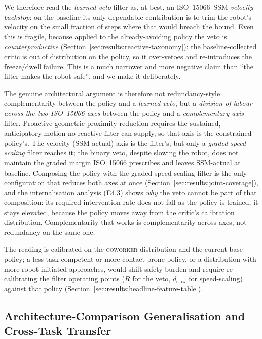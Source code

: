 \documentclass[11pt,a4paper]{report}
\newcommand{\ssm}{SSM}
\newcommand{\iso}{ISO~15066}
\newcommand{\coworker}{\textsc{coworker}}
\begin{document}
We therefore read the \emph{learned veto} filter as, at best, an
\iso{}~\ssm{} \emph{velocity backstop}: on the baseline its only
dependable contribution is to trim the robot's velocity on the small
fraction of steps where that would breach the bound. Even this is
fragile, because applied to the already-avoiding policy the veto is
\emph{counterproductive} (Section~\ref{sec:results:reactive-taxonomy}):
the baseline-collected critic is out of distribution on the policy, so
it over-vetoes and re-introduces the freeze/dwell failure. This is a
much narrower and more negative claim than ``the filter makes the
robot safe'', and we make it deliberately.

The genuine architectural argument is therefore not redundancy-style
complementarity between the policy and a \emph{learned veto}, but a
\emph{division of labour across the two \iso{} axes} between the policy
and a \emph{complementary-axis} filter. Proactive geometric-proximity
reduction requires the sustained, anticipatory motion no reactive
filter can supply, so that axis is the constrained policy's. The
velocity (\ssm{}-actual) axis is the filter's, but only a \emph{graded
speed-scaling} filter reaches it; the binary veto, despite slowing the
robot, does not maintain the graded margin \iso{} prescribes and
leaves \ssm{}-actual at baseline. Composing the policy with the graded
speed-scaling filter is the only configuration that reduces both axes
at once (Section~\ref{sec:results:joint-coverage}), and the
internalisation analysis (E4.3) shows \emph{why} the veto cannot be
part of that composition: its required intervention rate does not fall
as the policy is trained, it stays elevated, because the policy moves
away from the critic's calibration distribution. Complementarity that
works is complementarity across axes, not redundancy on the same one.

The reading is calibrated on the \coworker{} distribution and the
current base policy; a less task-competent or more contact-prone
policy, or a distribution with more robot-initiated approaches, would
shift safety burden and require re-calibrating the filter operating
points ($R$ for the veto, $d_{\mathrm{slow}}$ for speed-scaling)
against that policy
(Section~\ref{sec:results:headline-feature-table}).

\subsection{Architecture-Comparison Generalisation and Cross-Task Transfer}
\label{sec:disc:arch-gen}
\end{document}
